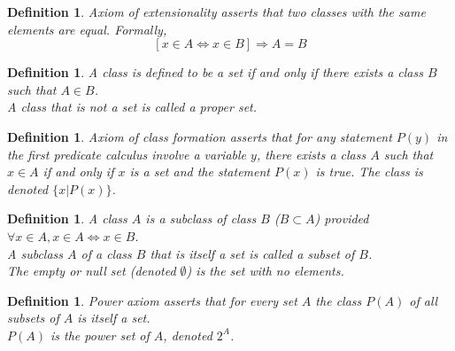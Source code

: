 \documentclass[a4paper,8pt]{article}
\theoremstyle{theorem}
\newtheorem{definition}[theorem]{Definition}
\begin{document}
\begin{definition}
\textit{{\color{blue} Axiom of extensionality}} asserts that two classes with the same elements are equal. Formally, 
\begin{equation}
\left[x \in A \Longleftrightarrow x \in B \right] \Rightarrow A=B \nonumber
\end{equation}
\end{definition}

\begin{definition}
A class is defined to be a \textit{{\color{blue} set}} if and only if there exists a class $ B $ such that $ A \in B $.\\
A class that is not a set is called a \textit{{\color{blue} proper set}}.\\
\end{definition}

\begin{definition}
\textit{{\color{blue} Axiom of class formation}} asserts that for any statement $ P(y) $ in the first predicate calculus involve a variable $ y $, there exists a class $ A $ such that $ x \in A $ if and only if $ x $ is a set and the statement $ P(x) $ is true. The class is denoted 	$\{ x | P(x) \}$.\\
\end{definition}

\begin{definition}
A class $ A $ is a \textit{{\color{blue} subclass}} of class $ B $ ($ B \subset A $) provided $ \forall x \in A, x \in A \Longleftrightarrow x \in B $. \\
A subclass $ A $ of a class $ B $ that is itself a set is called a \textit{{\color{blue} subset}} of $ B $.\\
The \textit{{\color{blue} empty or null set}} (denoted $\emptyset$) is the set with no elements.\\
\end{definition}

\begin{definition}
\textit{{\color{blue} Power axiom}} asserts that for every set $ A $ the class $ P(A) $ of all subsets of $ A $ is itself a set.\\
$ P(A) $ is the \textit{{\color{blue} power set}} of $ A $, denoted $ 2^A $.\\
\end{definition}
\end{document}
